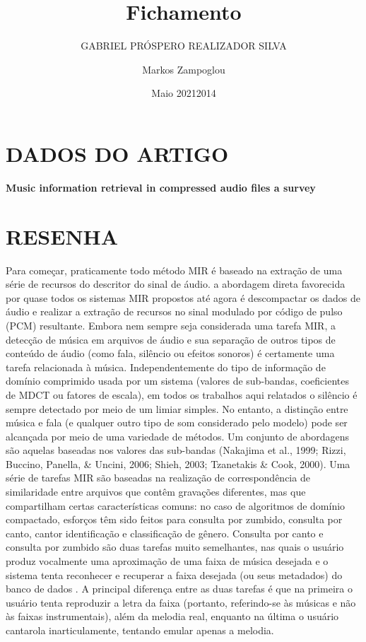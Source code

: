 \documentclass{article}
\title{Fichamento}
\author{GABRIEL PRÓSPERO REALIZADOR  SILVA}
\date{Maio 2021}
\begin{document}
\maketitle

\section{DADOS DO ARTIGO}
\textbf{Music information retrieval in compressed audio files a survey \\}
\author{Markos Zampoglou \\}
\date{2014}

\section{RESENHA}
Para começar, praticamente todo método MIR é baseado na extração de uma série de recursos do descritor do sinal de áudio.
a abordagem direta favorecida por quase todos os sistemas MIR propostos até agora é descompactar os dados de áudio e realizar a extração de recursos no sinal modulado por código de pulso (PCM) resultante.
Embora nem sempre seja considerada uma tarefa MIR, a detecção de música em arquivos de áudio e sua separação de outros tipos de conteúdo de áudio (como fala, silêncio ou efeitos sonoros) é certamente uma tarefa relacionada à música.
Independentemente do tipo de informação de domínio comprimido usada por um sistema (valores de sub-bandas, coeficientes de MDCT ou fatores de escala), em todos os trabalhos aqui relatados o silêncio é sempre detectado por meio de um limiar simples. No entanto, a distinção entre música e fala (e qualquer outro tipo de som considerado pelo modelo) pode ser alcançada por meio de uma variedade de métodos. Um conjunto de abordagens são aquelas baseadas nos valores das sub-bandas (Nakajima et al., 1999; Rizzi, Buccino, Panella, & Uncini, 2006; Shieh, 2003; Tzanetakis & Cook, 2000).
Uma série de tarefas MIR são baseadas na realização de correspondência de similaridade entre arquivos que contêm gravações diferentes, mas que compartilham certas características comuns: no caso de algoritmos de domínio compactado, esforços têm sido feitos para consulta por zumbido, consulta por canto, cantor identificação e classificação de gênero. Consulta por canto e consulta por zumbido são duas tarefas muito semelhantes, nas quais o usuário produz vocalmente uma aproximação de uma faixa de música desejada e o sistema tenta reconhecer e recuperar a faixa desejada (ou seus metadados) do banco de dados . A principal diferença entre as duas tarefas é que na primeira o usuário tenta reproduzir a letra da faixa (portanto, referindo-se às músicas e não às faixas instrumentais), além da melodia real, enquanto na última o usuário cantarola inarticulamente, tentando emular apenas a melodia.
\end{document}
